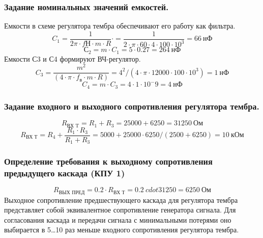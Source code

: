    \subsubsection{    Задание номинальных значений емкостей.}
   Емкости в схеме регулятора тембра обеспечивают его работу как фильтра.
   \begin{equation}
   \label{eq:equation5_9}
   C_1=\dfrac{1}{2 \pi \cdot f{\text{Н}}\cdot m \cdot R}  \cdot=\dfrac{1}{2 \cdot \pi \cdot 60 \cdot 4 \cdot 100 \cdot 10^3}=66~\text{нФ}
   \end{equation} 
   \begin{equation}
   \label{eq:equation5_10}
   С_2=m \cdot C_1=5 \cdot  0.27= 264~\text {нФ}
   \end{equation} 
        Емкости С3 и С4 формируют ВЧ-регулятор.
        \begin{equation}
   \label{eq:equation5_11}
   C_3=\dfrac {m^2}{(4\cdot \pi \cdot f_{\text{в}}\cdot m \cdot R) }= 4^2/(4 \cdot \pi \cdot 12000 \cdot 100 \cdot 10^3)=1~\text{нФ}
   \end{equation} 
  \begin{equation}
   \label{eq:equation5_12}
 C_4=m \cdot C_3=4 \cdot 1 \cdot 10^-9=4~\text{нФ}
\end{equation} 
\subsubsection{   Задание входного и выходного сопротивления регулятора тембра.   }
\begin{equation}
   \label{eq:equation5_13}
R_{\text{ВХ T}}=R_1+R_3=25000+6250=31250~\text{Ом}
\end{equation} 
\begin{equation}
   \label{eq:equation5_14}
   R_{\text{ВХ Т}}=R_4+\dfrac{R_1 \cdot R_3}{R_1+R_3} = 5000+25000 \cdot 6250 /(2500+6250)=10~\text{кОм}
   \end{equation}

\subsubsection{ Определение требования к выходному сопротивления предыдущего каскада (КПУ 1)   }

\begin{equation}
   \label{eq:equation5_15}
   R_{\text{ВЫХ ПРЕД}}=0.2 \cdot R_{\text{ВХ Т}}=0.2 \ cdot 31250=6250~\text{Ом}
\end{equation}
Выходное сопротивление предшествующего каскада для регулятора тембра представляет собой эквивалентное сопротивление генератора сигнала. Для согласования каскада и передачи сигнала с минимальными потерями оно выбирается в 5…10 раз меньше входного сопротивления регулятора тембра.

